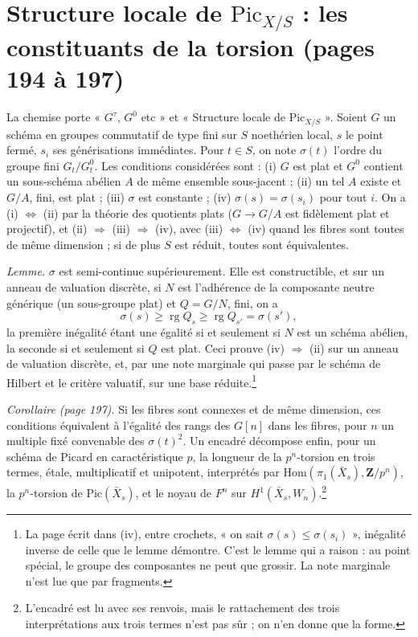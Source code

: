 \documentclass[11pt,a4paper]{article}
\begin{document}
\section*{Structure locale de $\mathrm{Pic}_{X/S}$ : les constituants de la torsion (pages 194 à 197)}

La chemise porte « $G^\tau$, $G^0$ etc » et « Structure locale de
$\mathrm{Pic}_{X/S}$ ». Soient $G$ un schéma en groupes commutatif de type fini
sur $S$ noethérien local, $s$ le point fermé, $s_i$ ses générisations
immédiates. Pour $t \in S$, on note $\sigma(t)$ l'ordre du groupe fini
$G_t/G_t^0$. Les conditions considérées sont : (i) $G$ est plat et $G^0$
contient un sous-schéma abélien $A$ de même ensemble sous-jacent ; (ii) un tel
$A$ existe et $G/A$, fini, est plat ; (iii) $\sigma$ est constante ; (iv)
$\sigma(s) = \sigma(s_i)$ pour tout $i$. On a (i) $\Leftrightarrow$ (ii) par la
théorie des quotients plats ($G \to G/A$ est fidèlement plat et projectif), et
(ii) $\Rightarrow$ (iii) $\Rightarrow$ (iv), avec (iii) $\Leftrightarrow$ (iv)
quand les fibres sont toutes de même dimension ; si de plus $S$ est réduit,
toutes sont équivalentes.

\emph{Lemme.} $\sigma$ est semi-continue supérieurement. Elle est
constructible, et sur un anneau de valuation discrète, si $N$ est
l'adhérence de la composante neutre générique (un sous-groupe plat) et
$Q = G/N$, fini, on a
\[
\sigma(s) \geq \operatorname{rg} Q_s \geq \operatorname{rg} Q_{s'} = \sigma(s') ,
\]
la première inégalité étant une égalité si et seulement si $N$ est un schéma abélien,
la seconde si et seulement si $Q$ est plat. Ceci prouve (iv) $\Rightarrow$ (ii)
sur un anneau de valuation discrète, et, par une note marginale qui passe par
le schéma de Hilbert et le critère valuatif, sur une base réduite.\footnote{La
page écrit dans (iv), entre crochets, « on sait $\sigma(s) \leq \sigma(s_i)$ »,
inégalité inverse de celle que le lemme démontre. C'est le lemme qui a raison :
au point spécial, le groupe des composantes ne peut que grossir. La note
marginale n'est lue que par fragments.}

\emph{Corollaire (page 197).} Si les fibres sont connexes et de même dimension,
ces conditions équivalent à l'égalité des rangs des $G[n]$ dans les fibres,
pour $n$ un multiple fixé convenable des $\sigma(t)^2$. Un encadré décompose
enfin, pour un schéma de Picard en caractéristique $p$, la longueur de la
$p^n$-torsion en trois termes, étale, multiplicatif et unipotent, interprétés
par $\mathrm{Hom}(\pi_1(\bar{X}_s), \mathbf{Z}/p^n)$, la $p^n$-torsion de
$\mathrm{Pic}(\bar{X}_s)$, et le noyau de $F^n$ sur $H^1(\bar{X}_s, W_n)$.\footnote{L'encadré
est lu avec ses renvois, mais le rattachement des trois interprétations aux
trois termes n'est pas sûr ; on n'en donne que la forme.}
\end{document}
